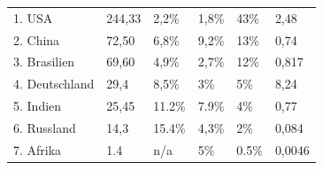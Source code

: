 \begin{itemize}
\begin{tabular}{|p{2.6cm}|p{1.5cm}|p{2cm}|p{1.5cm}|p{1.5cm}|p{1.7cm}|}
    1. USA  & 244,33  &2,2\%  & 1,8\% & 43\% & 2,48  \\
    2. China & 72,50 & 6,8\%  & 9,2\% & 13\% & 0,74 \\
    3. Brasilien & 69,60 & 4,9\%  & 2,7\% & 12\% & 0,817 \\
    4. Deutschland & 29,4 & 8,5\%  & 3\% & 5\% & 8,24 \\
    5. Indien & 25,45  & 11.2\%  & 7.9\% & 4\% & 0,77  \\
    6. Russland & 14,3  & 15.4\%  & 4,3\% & 2\% & 0,084  \\
    7. Afrika & 1.4  & n/a  & 5\% & 0.5\% & 0,0046 \\
 \hline
\end{tabular}


\end{itemize}


